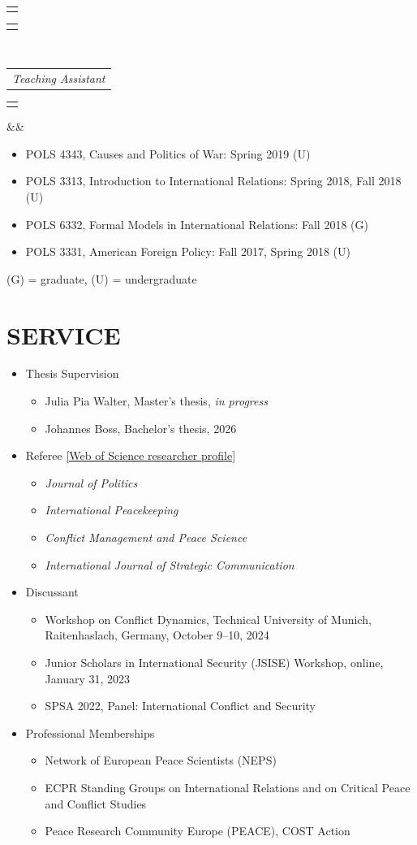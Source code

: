 \documentclass[11pt,a4paper,roman]{moderncv}
\makeatletter
\newcommand*{\customcventry}[7][.25em]{%
	\begin{tabular}{@{}l}{\bfseries #4}\end{tabular}%
	\hfill%
	\begin{tabular}{l@{}}{\bfseries #5}\end{tabular}\\
	\begin{tabular}{@{}l}{\itshape #3}\end{tabular}%
	\hfill%
	\begin{tabular}{l@{}}{\itshape #2}\end{tabular}%
	\ifx&#7&%
	\else{\\%
		\begin{minipage}{\maincolumnwidth}\small#7\end{minipage}}\fi%
	\par\addvspace{#1}}
\makeatother
\begin{document}
	\customcventry{}{Teaching Assistant}{}{}{}{}
	\begin{itemize}
		\item POLS 4343, Causes and Politics of War: Spring 2019 (U)
		\item POLS 3313, Introduction to International Relations: Spring 2018, Fall 2018 (U)
		\item POLS 6332, Formal Models in International Relations: Fall 2018 (G)
		\item POLS 3331, American Foreign Policy: Fall 2017, Spring 2018 (U)
	\end{itemize}
	
	\vspace*{1mm}
	\noindent\small{(G) = graduate, (U) = undergraduate}\normalsize
	
	\section{SERVICE}
	
	\begin{itemize}
		\item Thesis Supervision
		\begin{itemize}
			\item Julia Pia Walter, Master's thesis, \textit{in progress}
			\item Johannes Boss, Bachelor's thesis, 2026
		\end{itemize}
		\item Referee \href{https://www.webofscience.com/wos/author/rid/ACC-8915-2022}{[Web of Science researcher profile]}
		\begin{itemize}
			\item \textit{Journal of Politics}
			\item \textit{International Peacekeeping}
			\item \textit{Conflict Management and Peace Science}
			\item \textit{International Journal of Strategic Communication}
		\end{itemize}
		\item Discussant
		\begin{itemize}
			\item Workshop on Conflict Dynamics, Technical University of Munich, Raitenhaslach, Germany, October 9--10, 2024
			\item Junior Scholars in International Security (JSISE) Workshop, online, January 31, 2023
			\item SPSA 2022, Panel: International Conflict and Security
		\end{itemize}
		\item Professional Memberships
		\begin{itemize}
			\item Network of European Peace Scientists (NEPS)
			\item ECPR Standing Groups on International Relations and on Critical Peace and Conflict Studies
			\item Peace Research Community Europe (PEACE), COST Action
		\end{itemize}
	\end{itemize}
	
\end{document}

